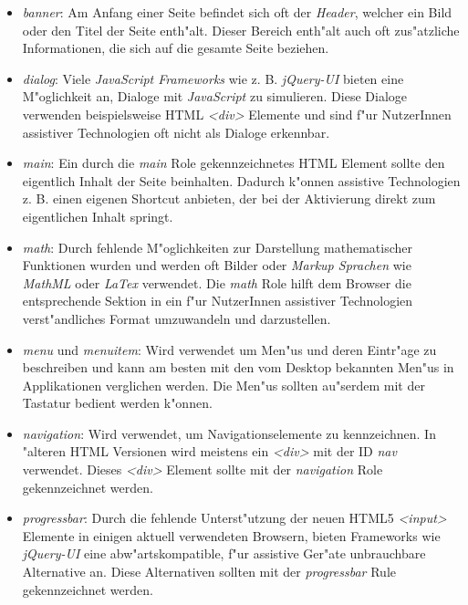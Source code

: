 \documentclass[a4paper,bibtotoc,oneside]{scrbook}
\begin{document}
\begin{itemize}
\item \emph{banner}: Am Anfang einer Seite befindet sich oft der \emph{Header}, welcher ein Bild oder den Titel der Seite enth"alt. Dieser Bereich enth"alt auch oft zus"atzliche Informationen, die sich auf die gesamte Seite beziehen. \cite[Abschnitt 5.4, banner]{aria_roles}

\item \emph{dialog}: Viele \emph{JavaScript Frameworks} wie z. B. \emph{jQuery-UI} \cite{jquery_ui} bieten eine M"oglichkeit an, Dialoge mit \emph{JavaScript} zu simulieren. Diese Dialoge verwenden beispielsweise HTML \emph{<div>} Elemente und sind f"ur NutzerInnen assistiver Technologien oft nicht als Dialoge erkennbar. \cite[Abschnitt 5.4, dialog]{aria_roles}

\item \emph{main}: Ein durch die \emph{main} Role gekennzeichnetes HTML Element sollte den eigentlich Inhalt der Seite beinhalten. Dadurch k"onnen assistive Technologien z. B. einen eigenen Shortcut anbieten, der bei der Aktivierung direkt zum eigentlichen Inhalt springt. \cite[Abschnitt 5.4, main]{aria_roles}

\item \emph{math}: Durch fehlende M"oglichkeiten zur Darstellung mathematischer Funktionen wurden und werden oft Bilder oder \emph{Markup Sprachen} wie \emph{MathML} oder \emph{LaTex} verwendet. Die \emph{math} Role hilft dem Browser die entsprechende Sektion in ein f"ur NutzerInnen assistiver Technologien verst"andliches Format umzuwandeln und darzustellen. \cite[Abschnitt 5.4, math]{aria_roles}

\item \emph{menu} und \emph{menuitem}: Wird verwendet um Men"us und deren Eintr"age zu beschreiben und kann am besten mit den vom Desktop bekannten Men"us in Applikationen verglichen werden. Die Men"us sollten au"serdem mit der Tastatur bedient werden k"onnen. \cite[Abschnitt 5.4, menu, menuitem]{aria_roles}

\item \emph{navigation}: Wird verwendet, um Navigationselemente zu kennzeichnen. In "alteren HTML Versionen wird meistens ein \emph{<div>} mit der ID \emph{nav} verwendet. Dieses \emph{<div>} Element sollte mit der \emph{navigation} Role gekennzeichnet werden. \cite[Abschnitt 5.4, navigation]{aria_roles}

\item \emph{progressbar}: Durch die fehlende Unterst"utzung der neuen HTML5 \emph{<input>} Elemente in einigen aktuell verwendeten Browsern, bieten Frameworks wie \emph{jQuery-UI}\cite{jquery_ui} eine abw"artskompatible, f"ur assistive Ger"ate unbrauchbare Alternative an. Diese Alternativen sollten mit der \emph{progressbar} Rule gekennzeichnet werden. \cite[Abschnitt 5.4, progressbar]{aria_roles}


\end{itemize}
\end{document}

